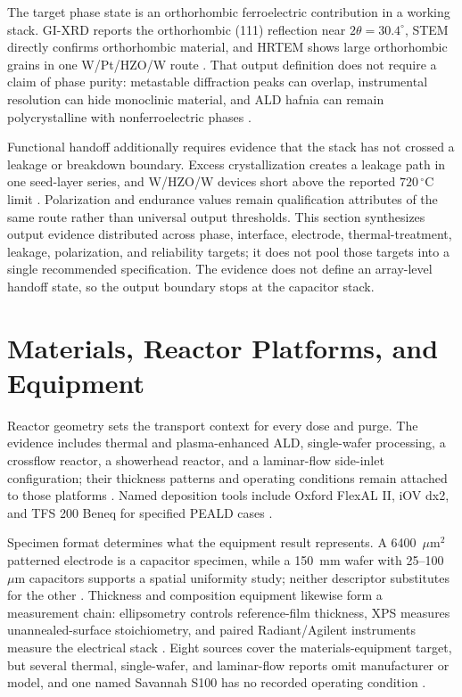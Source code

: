 \documentclass[11pt,a4paper]{report}
\begin{document}
The target phase state is an orthorhombic ferroelectric contribution in a working stack. GI-XRD reports the orthorhombic (111) reflection near $2\theta=30.4^\circ$, STEM directly confirms orthorhombic material, and HRTEM shows large orthorhombic grains in one W/Pt/HZO/W route \cite{song2021ferro,kashir2021wake}. That output definition does not require a claim of phase purity: metastable diffraction peaks can overlap, instrumental resolution can hide monoclinic material, and ALD hafnia can remain polycrystalline with nonferroelectric phases \cite{song2021ferro,choi2025purge,kashir2021wake}.

Functional handoff additionally requires evidence that the stack has not crossed a leakage or breakdown boundary. Excess crystallization creates a leakage path in one seed-layer series, and W/HZO/W devices short above the reported $720\,^{\circ}$C limit \cite{song2023seed,kashir2021wake}. Polarization and endurance values remain qualification attributes of the same route rather than universal output thresholds. This section synthesizes output evidence distributed across phase, interface, electrode, thermal-treatment, leakage, polarization, and reliability targets; it does not pool those targets into a single recommended specification. The evidence does not define an array-level handoff state, so the output boundary stops at the capacitor stack.

\section{Materials, Reactor Platforms, and Equipment}
\label{sec:ald-materials-equipment}

Reactor geometry sets the transport context for every dose and purge. The evidence includes thermal and plasma-enhanced ALD, single-wafer processing, a crossflow reactor, a showerhead reactor, and a laminar-flow side-inlet configuration; their thickness patterns and operating conditions remain attached to those platforms \cite{choi2022chamber,neuber2022peald,kaatranen2026unif}. Named deposition tools include Oxford FlexAL II, iOV dx2, and TFS 200 Beneq for specified PEALD cases \cite{choi2025purge,song2023seed,liu2025zrrich}.

Specimen format determines what the equipment result represents. A 6400~$\mu$m$^2$ patterned electrode is a capacitor specimen, while a 150~mm wafer with 25--100~$\mu$m capacitors supports a spatial uniformity study; neither descriptor substitutes for the other \cite{choi2022chamber,kaatranen2026unif}. Thickness and composition equipment likewise form a measurement chain: ellipsometry controls reference-film thickness, XPS measures unannealed-surface stoichiometry, and paired Radiant/Agilent instruments measure the electrical stack \cite{zhang2015inductive,liu2025zrrich}. Eight sources cover the materials-equipment target, but several thermal, single-wafer, and laminar-flow reports omit manufacturer or model, and one named Savannah S100 has no recorded operating condition \cite{kim2020tin,zhang2015inductive,kaatranen2026unif}.
\end{document}
